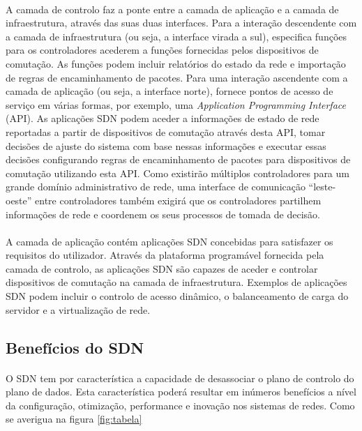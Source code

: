 \documentclass{llncs}
\begin{document}
\paragraph{}
A camada de controlo faz a ponte entre a camada de aplicação e a camada de infraestrutura, através das suas duas interfaces. Para a interação descendente com a camada de infraestrutura (ou seja, a interface virada a sul), especifica funções para os controladores acederem a funções fornecidas pelos dispositivos de comutação. As funções podem incluir relatórios do estado da rede e importação de regras de encaminhamento de pacotes. Para uma interação ascendente com a camada de aplicação (ou seja, a interface norte), fornece pontos de acesso de serviço em várias formas, por exemplo, uma \textit{Application Programming Interface} (API). As aplicações SDN podem aceder a informações de estado de rede reportadas a partir de dispositivos de comutação através desta API, tomar decisões de ajuste do sistema com base nessas informações e executar essas decisões configurando regras de encaminhamento de pacotes para dispositivos de comutação utilizando esta API. Como existirão múltiplos controladores para um grande domínio administrativo de rede, uma interface de comunicação “leste-oeste” entre controladores também exigirá que os controladores partilhem informações de rede e coordenem os seus processos de tomada de decisão.
\paragraph{}
A camada de aplicação contém aplicações SDN concebidas para satisfazer os requisitos do utilizador. Através da plataforma programável fornecida pela camada de controlo, as aplicações SDN são capazes de aceder e controlar dispositivos de comutação na camada de infraestrutura. Exemplos de aplicações SDN podem incluir o controlo de acesso dinâmico, o balanceamento de carga do servidor e a virtualização de rede.

\subsection{Benefícios do SDN}
\paragraph{}
O SDN tem por característica a capacidade de desassociar o plano de controlo do plano de dados. Esta característica poderá resultar em inúmeros benefícios a nível da 
configuração, otimização, performance e inovação nos sistemas de redes. Como se averigua na figura \ref{fig:tabela}
\end{document}
